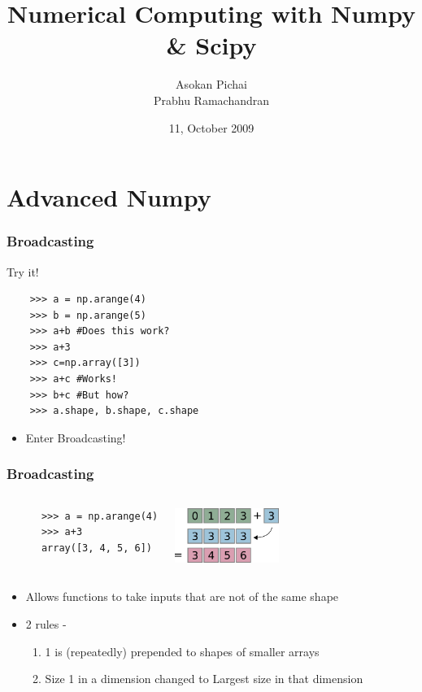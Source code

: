 \documentclass[14pt,compress]{beamer}
\title[]{Numerical Computing with Numpy \& Scipy}
\author[FOSSEE Team] {Asokan Pichai\\Prabhu Ramachandran}
\institute[IIT Bombay] {Department of Aerospace Engineering\\IIT Bombay}
\date[] {11, October 2009}
\begin{document}
\begin{frame}
  \maketitle
\end{frame}

\section{Advanced Numpy}
\begin{frame}[fragile]
  \frametitle{Broadcasting}
  Try it!
  \begin{lstlisting}
    >>> a = np.arange(4)
    >>> b = np.arange(5)
    >>> a+b #Does this work?
    >>> a+3
    >>> c=np.array([3])
    >>> a+c #Works!
    >>> b+c #But how?
    >>> a.shape, b.shape, c.shape
  \end{lstlisting}
  \begin{itemize}
    \item Enter Broadcasting!
  \end{itemize}
\end{frame}

\begin{frame}[fragile]
  \frametitle{Broadcasting}
  \begin{columns}
    \hspace*{-1.5in}
    \begin{lstlisting}
      >>> a = np.arange(4)
      >>> a+3
      array([3, 4, 5, 6])
    \end{lstlisting}
    \includegraphics[height=0.7in, interpolate=true]{data/broadcast_scalar}
  \end{columns}
  \begin{itemize}
    \item Allows functions to take inputs that are not of the same shape
    \item 2 rules -
      \begin{enumerate}
      \item 1 is (repeatedly) prepended to shapes of smaller arrays
      \item Size 1 in a dimension changed to Largest size in that dimension
      \end{enumerate}
  \end{itemize}
\end{frame}
\end{document}
